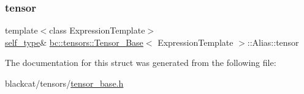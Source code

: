 \subsubsection{\texorpdfstring{tensor}{tensor}}
{\footnotesize\ttfamily template$<$class Expression\+Template$>$ \\
\hyperlink{classbc_1_1tensors_1_1Expression__Base}{self\+\_\+type}\& \hyperlink{classbc_1_1tensors_1_1Tensor__Base}{bc\+::tensors\+::\+Tensor\+\_\+\+Base}$<$ Expression\+Template $>$\+::Alias\+::tensor}



The documentation for this struct was generated from the following file\+:\begin{DoxyCompactItemize}
\item 
blackcat/tensors/\hyperlink{tensor__base_8h}{tensor\+\_\+base.\+h}\end{DoxyCompactItemize}
